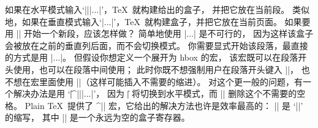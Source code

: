 \dangerexercise 如果在水平模式输入`|\hbox||{...}|'，\TeX\ 就构建给出的盒子，
并把它放在当前段。%
类似地，如果在垂直模式输入`|\hbox{...}|'，\TeX\ 就构建盒子，并把它放在当前页面。%
如果要用 |\hbox| 开始一个新段，应该怎样做？
\answer 简单地使用 |\hbox{...}| 是不可行的，
因为这样该盒子会被放在之前的垂直列后面，而不会切换模式。
你需要显式开始该段落，最直接的方式是用 |\indent\hbox{...}|。
但假设你想定义一个展开为 hbox 的宏，
该宏既可以在段落开头使用，也可以在段落中间使用；
此时你既不想强制用户在段落开头键入 |\indent|，
也不想在宏里面使用 |\indent|（这样可能插入不需要的缩进）。
对这个更一般的问题，有一个解决办法是用 `|\|\]^|\unskip||\hbox{...}|'，
因为 |\|\] 将切换到水平模式，而 |\unskip| 删除这个不需要的空格。
Plain \TeX\ 提供了 ^|\leavevmode| 宏，它给出的解决方法也许是效率最高的：
|\leavevmode| 是 `|\unhbox\voidbox|' 的缩写，
其中 |\voidbox| 是一个永远为空的盒子寄存器。

